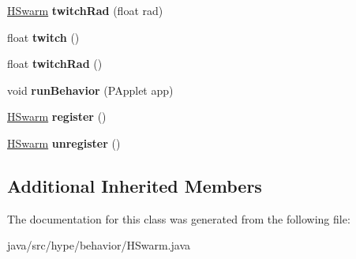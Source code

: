 \begin{DoxyCompactItemize}
\item 
\hypertarget{classhype_1_1behavior_1_1_h_swarm_a86b51abc01db6f16dee416eed5cf5009}{\hyperlink{classhype_1_1behavior_1_1_h_swarm}{H\-Swarm} {\bfseries twitch\-Rad} (float rad)}\label{classhype_1_1behavior_1_1_h_swarm_a86b51abc01db6f16dee416eed5cf5009}

\item 
\hypertarget{classhype_1_1behavior_1_1_h_swarm_ac2e03a345f2060a9b1031a032610a254}{float {\bfseries twitch} ()}\label{classhype_1_1behavior_1_1_h_swarm_ac2e03a345f2060a9b1031a032610a254}

\item 
\hypertarget{classhype_1_1behavior_1_1_h_swarm_a1c8e689465a9d5fe631bc82048f5b92f}{float {\bfseries twitch\-Rad} ()}\label{classhype_1_1behavior_1_1_h_swarm_a1c8e689465a9d5fe631bc82048f5b92f}

\item 
\hypertarget{classhype_1_1behavior_1_1_h_swarm_ac6740ebc12f11d4b601e2b41602852fc}{void {\bfseries run\-Behavior} (P\-Applet app)}\label{classhype_1_1behavior_1_1_h_swarm_ac6740ebc12f11d4b601e2b41602852fc}

\item 
\hypertarget{classhype_1_1behavior_1_1_h_swarm_aed2bec15f13b547c9102186b9d5aeede}{\hyperlink{classhype_1_1behavior_1_1_h_swarm}{H\-Swarm} {\bfseries register} ()}\label{classhype_1_1behavior_1_1_h_swarm_aed2bec15f13b547c9102186b9d5aeede}

\item 
\hypertarget{classhype_1_1behavior_1_1_h_swarm_a421e4284f278470402c8fab4b262a01f}{\hyperlink{classhype_1_1behavior_1_1_h_swarm}{H\-Swarm} {\bfseries unregister} ()}\label{classhype_1_1behavior_1_1_h_swarm_a421e4284f278470402c8fab4b262a01f}

\end{DoxyCompactItemize}
\subsection*{Additional Inherited Members}


The documentation for this class was generated from the following file\-:\begin{DoxyCompactItemize}
\item 
java/src/hype/behavior/H\-Swarm.\-java\end{DoxyCompactItemize}
